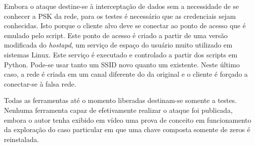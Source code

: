 \documentclass[12pt]{article}
\begin{document}
Embora o ataque destine-se à interceptação de dados sem a necessidade de se conhecer a PSK da rede, para os testes é necessário que as credenciais sejam conhecidas. Isto porque o cliente alvo deve se conectar ao ponto de acesso que é emulado pelo script. Este ponto de acesso é criado a partir de uma versão modificada do \textit{hostapd}, um serviço de espaço do usuário muito utilizado em sistemas Linux. Este serviço é executado e controlado a partir dos scripts em Python. Pode-se usar tanto um SSID novo quanto um existente. Neste último caso, a rede é criada em um canal diferente do da original e o cliente é forçado a conectar-se à falsa rede.

Todas as ferramentas até o momento liberadas destinam-se somente a testes. Nenhuma ferramenta capaz de efetivamente realizar o ataque foi publicada, embora o autor tenha exibido em vídeo uma prova de conceito em funcionamento da exploração do caso particular em que uma chave composta somente de zeros é reinstalada.




     
\end{document}
